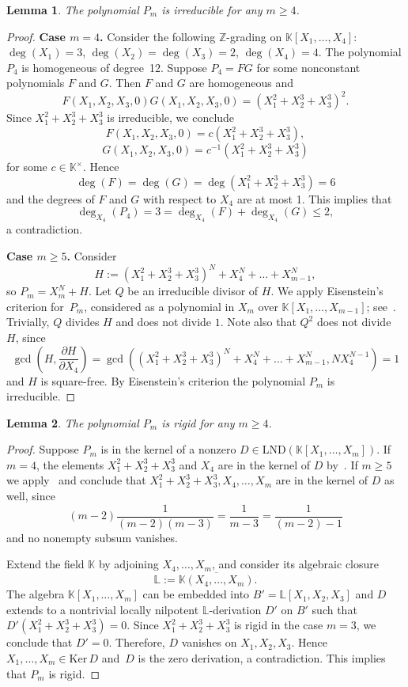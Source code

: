 \documentclass[12pt,reqno]{amsart}
\newcommand{\KK}{\mathbb K}
\newcommand{\ZZ}{\mathbb Z}
\newcommand{\Ker}{\mathrm{Ker}\,}
\newcommand{\LND}{\mathrm{LND}}
\theoremstyle{plain}
\newtheorem{lemma}{Lemma}
\theoremstyle{remark}
\theoremstyle{definition}
\begin{document}
\begin{lemma}
\label{lemm>=4irr}
    The polynomial $P_m$ is irreducible for any $m\geq 4$.
\end{lemma}
\begin{proof}
    \textbf{Case $m=4$.} Consider the following $\ZZ$-grading on $\KK[X_1,\dots,X_4]$: $\deg(X_1)=3$, $\deg(X_2)=\deg(X_3)=2$, $\deg(X_4)=4$. The polynomial $P_4$ is homogeneous of degree~12. Suppose $P_4=FG$ for some nonconstant polynomials $F$ and $G$. Then $F$ and $G$ are homogeneous and $$F(X_1,X_2,X_3,0)G(X_1,X_2,X_3,0)=(X_1^2+X_2^3+X_3^3)^2.$$ Since $X_1^2+X_2^3+X_3^3$ is irreducible, we conclude $$F(X_1,X_2,X_3,0)=c(X_1^2+X_2^3+X_3^3),$$ $$G(X_1,X_2,X_3,0)=c^{-1}(X_1^2+X_2^3+X_3^3)$$ for some $c\in\KK^{\times}$. Hence $$\deg(F)=\deg(G)=\deg(X_1^2+X_2^3+X_3^3)=6$$ and the degrees of $F$ and $G$ with respect to $X_4$ are at most 1. This implies that $$\deg_{X_4}(P_4)=3=\deg_{X_4}(F)+\deg_{X_4}(G)\leq 2,$$ a contradiction.

    \textbf{Case $m\geq 5$.} Consider $$H:=(X_1^2+X_2^3+X_3^3)^N+X_4^N+\dots+X_{m-1}^N,$$ so $P_m=X_m^N+H$. Let $Q$ be an irreducible divisor of $H$. We apply Eisenstein's criterion for~$P_m$, considered as a polynomial in $X_m$ over $\KK[X_1,\dots,X_{m-1}]$; see~\cite[Chapter IV, Theorem 3.1]{L}. Trivially, $Q$ divides $H$ and does not divide $1$. Note also that $Q^2$ does not divide~$H$, since $$\gcd\left(H,\frac{\partial H}{\partial X_4}\right)=\gcd((X_1^2+X_2^3+X_3^3)^N+X_4^N+\dots+X_{m-1}^N, NX_4^{N-1})=1$$ and $H$ is square-free. By Eisenstein's criterion the polynomial $P_m$ is irreducible.
\end{proof}

\begin{lemma}
\label{lemm>=4r}
    The polynomial $P_m$ is rigid for any $m\geq 4$.
\end{lemma}
\begin{proof}
Suppose $P_m$ is in the kernel of a nonzero $D\in\LND(\KK[X_1,\dots,X_m])$. If $m=4$, the elements $X_1^2+X_2^3+X_3^3$ and $X_4$ are in the kernel of $D$ by~\cite[Theorem 2.50 (a)]{F}. If $m\geq 5$ we apply~\cite[Theorem 3.3]{K23} and conclude that $X_1^2+X_2^3+X_3^3, X_4,\dots,X_m$ are in the kernel of $D$ as well, since $$(m-2)\frac{1}{(m-2)(m-3)}=\frac{1}{m-3}= \frac{1}{(m-2)-1}$$ and no nonempty subsum vanishes.

Extend the field $\KK$ by adjoining $X_4,\dots,X_m$, and consider its algebraic closure
$$\mathbb{L}:= \overline{\mathbb{K}(X_4,\dots,X_m)}.$$
The algebra $\KK[X_1,\dots,X_m]$ can be embedded into
$B'=\mathbb{L}[X_1,X_2,X_3]$
and $D$ extends to a nontrivial locally nilpotent $\mathbb{L}$-derivation $D'$ on $B'$ such that $D'(X_1^2+X_2^3+X_3^3)=0$. Since $X_1^2+X_2^3+X_3^3$ is rigid in the case $m=3$, we conclude that $D'=0$. Therefore, $D$ vanishes on $X_1,X_2,X_3$. Hence $X_1,\dots,X_m\in\Ker D$ and~$D$ is the zero derivation, a contradiction. This implies that $P_m$ is rigid.
\end{proof}
\end{document}
